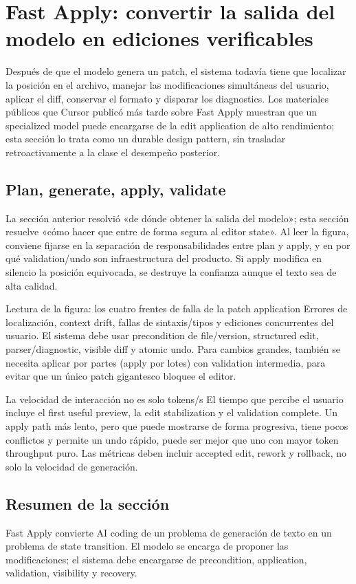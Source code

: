 \section{Fast Apply: convertir la salida del modelo en ediciones verificables}

Después de que el modelo genera un patch, el sistema todavía tiene que localizar la posición en el archivo, manejar las modificaciones simultáneas del usuario, aplicar el diff, conservar el formato y disparar los diagnostics. Los materiales públicos que Cursor publicó más tarde sobre Fast Apply muestran que un specialized model puede encargarse de la edit application de alto rendimiento; esta sección lo trata como un durable design pattern, sin trasladar retroactivamente a la clase el desempeño posterior.

\subsection{Plan, generate, apply, validate}

La sección anterior resolvió «de dónde obtener la salida del modelo»; esta sección resuelve «cómo hacer que entre de forma segura al editor state». Al leer la figura, conviene fijarse en la separación de responsabilidades entre plan y apply, y en por qué validation/undo son infraestructura del producto. Si apply modifica en silencio la posición equivocada, se destruye la confianza aunque el texto sea de alta calidad.


\begin{knowledgebox}{Lectura de la figura: los cuatro frentes de falla de la patch application}
Errores de localización, context drift, fallas de sintaxis/tipos y ediciones concurrentes del usuario. El sistema debe usar precondition de file/version, structured edit, parser/diagnostic, visible diff y atomic undo. Para cambios grandes, también se necesita aplicar por partes (apply por lotes) con validation intermedia, para evitar que un único patch gigantesco bloquee el editor.
\end{knowledgebox}

\begin{importantbox}{La velocidad de interacción no es solo tokens/s}
El tiempo que percibe el usuario incluye el first useful preview, la edit stabilization y el validation complete. Un apply path más lento, pero que puede mostrarse de forma progresiva, tiene pocos conflictos y permite un undo rápido, puede ser mejor que uno con mayor token throughput puro. Las métricas deben incluir accepted edit, rework y rollback, no solo la velocidad de generación.
\end{importantbox}

\subsection{Resumen de la sección}

Fast Apply convierte AI coding de un problema de generación de texto en un problema de state transition. El modelo se encarga de proponer las modificaciones; el sistema debe encargarse de precondition, application, validation, visibility y recovery.
